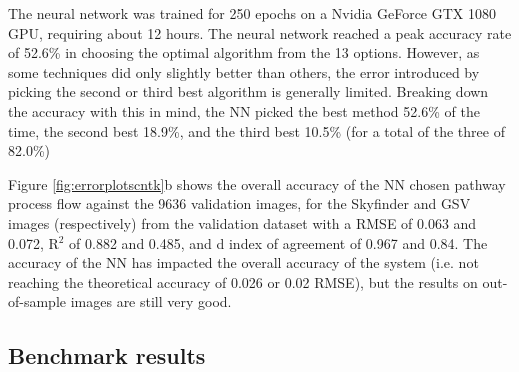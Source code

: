 \documentclass[final,3p,times,authoryear]{elsarticle}
\begin{document}
The neural network was trained for 250 epochs on a Nvidia GeForce GTX 1080 GPU, requiring about 12 hours. The neural network reached a peak accuracy rate of 52.6\% in choosing the optimal algorithm from the 13 options. However, as some techniques did only slightly better than others, the error introduced by picking the second or third best algorithm is generally limited. Breaking down the accuracy with this in mind, the NN picked the best method 52.6\% of the time, the second best 18.9\%, and the third best 10.5\% (for a total of the three of 82.0\%)

Figure \ref{fig:errorplotscntk}b shows the overall accuracy of the NN chosen pathway process flow against the 9636 validation images, for the Skyfinder and GSV images (respectively) from the validation dataset with a RMSE of 0.063 and 0.072, R$^{2}$ of 0.882 and 0.485, and d index of agreement of 0.967 and 0.84. The accuracy of the NN has impacted the overall accuracy of the system (i.e. not reaching the theoretical accuracy of 0.026 or 0.02 RMSE), but the results on out-of-sample images are still very good. 













\subsection{Benchmark results}
\end{document}

